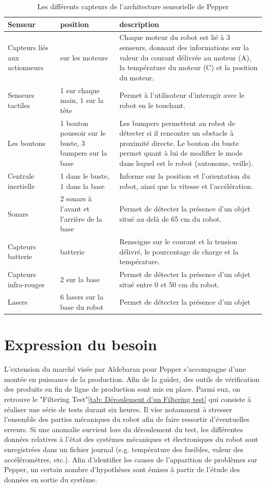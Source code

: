 \begin{table}[h]
	\begin{tabular}{ | p{3cm} | p{4cm} | p{7cm} | }
		\hline
		Senseur & position & description \\
		\hline
		Capteurs liés aux actionneurs & sur les moteurs & Chaque moteur du robot est lié à 3 senseurs, donnant des informations sur la valeur du courant délivrée au moteur (A), la température du moteur (C) et la position du moteur. \\
		\hline
		Senseurs tactiles & 1 sur chaque main, 1 sur la tête & Permet à l'utilisateur d'interagir avec le robot en le touchant.	\\	
		\hline 
		Les boutons & 1 bouton poussoir sur le buste, 3 bumpers sur la base & Les bumpers permettent au robot de détecter si il rencontre un obstacle à proximité directe. Le bouton du buste permet quant à lui de modifier le mode dans lequel est le robot (autonome, veille). \\
		\hline 
		Centrale inertielle & 1 dans le buste, 1 dans la base & Informe sur la position et l'orientation du robot, ainsi que la vitesse et l'accélération. \\
		\hline
		Sonars & 2 sonars à l'avant et l'arrière de la base & Permet de détecter la présence d'un objet situé au delà de 65 cm du robot. \\
		\hline 
		Capteurs batterie & batterie & Renseigne sur le courant et la tension délivré, le pourcentage de charge et la température. \\
		\hline
		Capteurs infra-rouges & 2 sur la base &  Permet de détecter la présence d'un objet situé entre 0 et 50 cm du robot. \\
		\hline
		Lasers & 6 lasers sur la base du robot & Permet de détecter la présence d'un objet \\
		\hline 
	\end{tabular}
	\caption[Les différents capteurs de Pepper]{Les différents capteurs de l'architecture sensorielle de Pepper}
	\label {tab: Les différents capteurs de Pepper}
\end{table}


\section{Expression du besoin}
\label{Introduction:Expression du besoin}
L'extension du marché visée par Aldebaran pour Pepper s'accompagne d'une montée en puissance de la production. Afin de la guider, des outils de vérification des produits en fin de ligne de production sont mis en place. Parmi eux, on retrouve le "Filtering Test"\ref{tab: Déroulement d'un Filtering test} qui consiste à réaliser une série de tests durant six heures. Il vise notamment à stresser l'ensemble des parties mécaniques du robot afin de faire ressortir d'éventuelles erreurs. Si une anomalie survient lors du déroulement du test, les différentes données relatives à l'état des systèmes mécaniques et électroniques du robot sont enregistrées dans un fichier journal (e.g. température des fusibles, valeur des accéléromètres, etc.). Afin d'identifier les causes de l'apparition de problèmes sur Pepper, un certain nombre d'hypothèses sont émises à partir de l'étude des données en sortie du système. 

